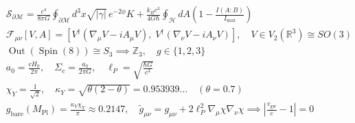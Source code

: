 \documentclass[11pt,letterpaper]{article}
\begin{document}
\begin{align*}
&\mathcal{S}_{\partial\mathcal{M}} = \frac{c^4}{8\pi G} \oint_{\partial\mathcal{M}} d^3x \sqrt{|\gamma|} \, e^{-2\phi} K + \frac{k_B c^3}{4 G \hbar} \oint_{\mathcal{H}} dA \left( 1 - \frac{I(A:B)}{I_{\max}} \right) \\[1.1em]
&\mathcal{F}_{\mu\nu}[V,A] = [V^\dagger (\nabla_\mu V - i A_\mu V), \; V^\dagger (\nabla_\nu V - i A_\nu V)], \quad V \in V_2(\mathbb{R}^3) \cong SO(3) \\[1.1em]
&\operatorname{Out}(\operatorname{Spin}(8)) \cong S_3 \implies \mathbb{Z}_3, \quad g \in \{1, 2, 3\} \\[1.1em]
&a_0 = \frac{c H_0}{2\pi}, \quad \Sigma_c = \frac{a_0}{2\pi G}, \quad \ell_P = \sqrt{\frac{\hbar G}{c^3}} \\[1.1em]
&\chi_Y = \frac{1}{\sqrt{2}}, \quad \kappa_Y = \sqrt{\theta(2-\theta)} = 0.953939\dots \quad (\theta = 0.7) \\[1.1em]
&g_{\mathrm{bare}}(M_{\mathrm{Pl}}) = \frac{\kappa_Y \chi_Y}{\pi} \approx 0.2147, \quad \tilde{g}_{\mu\nu} = g_{\mu\nu} + 2\ell_P^2 \nabla_\mu\chi \nabla_\nu\chi \implies \left| \frac{v_{\mathrm{gw}}}{c} - 1 \right| = 0
\end{align*}

\vspace*{\fill}
\end{document}

